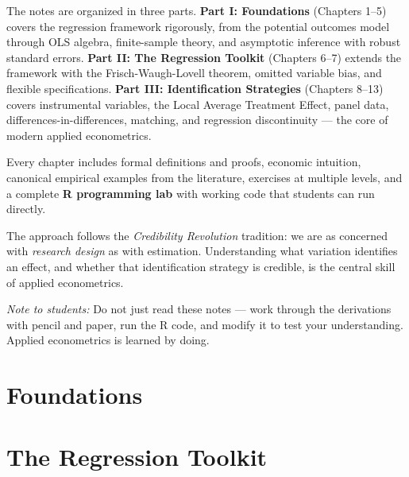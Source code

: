\documentclass[11pt, twoside, openright]{book}
\theoremstyle{econstyle}
\theoremstyle{defstyle}
\begin{document}
The notes are organized in three parts.
\textbf{Part I: Foundations} (Chapters 1--5) covers the regression framework rigorously, from the
potential outcomes model through OLS algebra, finite-sample theory, and asymptotic inference with
robust standard errors. \textbf{Part II: The Regression Toolkit} (Chapters 6--7) extends the
framework with the Frisch-Waugh-Lovell theorem, omitted variable bias, and flexible specifications.
\textbf{Part III: Identification Strategies} (Chapters 8--13) covers instrumental variables,
the Local Average Treatment Effect, panel data, differences-in-differences, matching, and regression
discontinuity --- the core of modern applied econometrics.

Every chapter includes formal definitions and proofs, economic intuition, canonical empirical examples
from the literature, exercises at multiple levels, and a complete \textbf{R programming lab} with
working code that students can run directly.

The approach follows the \textit{Credibility Revolution} tradition: we are as concerned with
\emph{research design} as with estimation. Understanding what variation identifies an effect,
and whether that identification strategy is credible, is the central skill of applied econometrics.

\bigskip
\noindent\textit{Note to students:} Do not just read these notes --- work through the derivations
with pencil and paper, run the R code, and modify it to test your understanding. Applied econometrics
is learned by doing.

\mainmatter

\part{Foundations}







\part{The Regression Toolkit}
\end{document}
